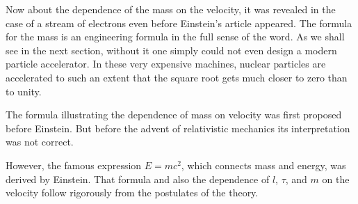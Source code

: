 Now about the dependence of the mass on the velocity, it was revealed in the case of a stream of electrons even before Einstein's article appeared. The formula for the mass is an engineering formula in the full sense of the word. As we shall see in the next section, without it one simply could not even design a modern particle accelerator. In these very expensive machines, nuclear particles are accelerated to such an extent that the square root gets much closer to zero than to unity.

The formula illustrating the dependence of mass on velocity was first proposed before Einstein. But before the advent of relativistic mechanics its interpretation was not correct.

However, the famous expression $E = mc^{2}$, which connects mass and energy, was derived by Einstein. That formula and also the dependence of $l$, $\tau$, and $m$ on the velocity follow rigorously from the postulates of the theory.

